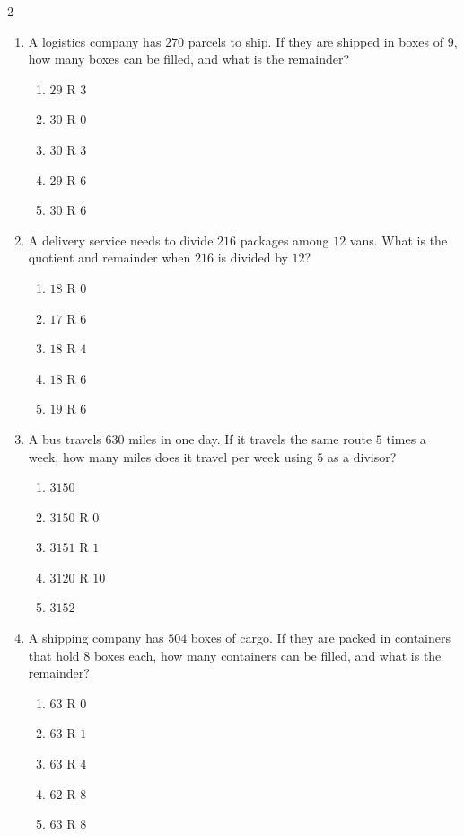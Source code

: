 \documentclass[10pt]{article}
\begin{document}
\begin{multicols}{2}
\begin{enumerate}[label=\textbf{Q\arabic*.}, leftmargin=*, itemsep=6pt, parsep=0pt]
  \item \small A logistics company has $270$ parcels to ship. If they are shipped in boxes of $9$, how many boxes can be filled, and what is the remainder?
  \begin{enumerate}[label=(\Alph*), leftmargin=0.6cm, nosep, itemsep=2pt]
    \item $29$ R $3$
    \item $30$ R $0$
    \item $30$ R $3$
    \item $29$ R $6$
    \item $30$ R $6$
  \end{enumerate}

  \item \small A delivery service needs to divide $216$ packages among $12$ vans. What is the quotient and remainder when $216$ is divided by $12$?
  \begin{enumerate}[label=(\Alph*), leftmargin=0.6cm, nosep, itemsep=2pt]
    \item $18$ R $0$
    \item $17$ R $6$
    \item $18$ R $4$
    \item $18$ R $6$
    \item $19$ R $6$
  \end{enumerate}

  \item \small A bus travels $630$ miles in one day. If it travels the same route $5$ times a week, how many miles does it travel per week using $5$ as a divisor?
  \begin{enumerate}[label=(\Alph*), leftmargin=0.6cm, nosep, itemsep=2pt]
    \item $3150$
    \item $3150$ R $0$
    \item $3151$ R $1$
    \item $3120$ R $10$
    \item $3152$
  \end{enumerate}

  \item \small A shipping company has $504$ boxes of cargo. If they are packed in containers that hold $8$ boxes each, how many containers can be filled, and what is the remainder?
  \begin{enumerate}[label=(\Alph*), leftmargin=0.6cm, nosep, itemsep=2pt]
    \item $63$ R $0$
    \item $63$ R $1$
    \item $63$ R $4$
    \item $62$ R $8$
    \item $63$ R $8$
  \end{enumerate}


\end{enumerate}
\end{multicols}
\end{document}
